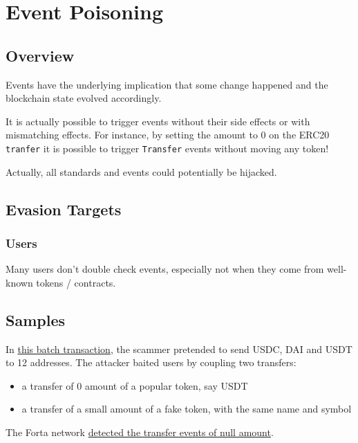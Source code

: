 \section{Event Poisoning} \label{sec:event-poisoning}

\subsection{Overview}

Events have the underlying implication that some change happened and the blockchain state evolved accordingly.

It is actually possible to trigger events without their side effects or with mismatching effects.
For instance, by setting the amount to 0 on the ERC20 \lstinline[language=Solidity]{tranfer} it is possible to trigger \lstinline[language=Solidity]{Transfer} events without moving any token!

Actually, all standards and events could potentially be hijacked.

\subsection{Evasion Targets}

\subsubsection{Users}

Many users don't double check events, especially not when they come from well-known tokens / contracts.

\subsection{Samples}

In \href{https://explorer.phalcon.xyz/tx/polygon/0x8a5f75338bfbf78b0969cdf5bacfe24c65e703ea94b430c470193b3d2a094441?line=1}{this batch transaction}, the scammer pretended to send USDC, DAI and USDT to 12 addresses.
The attacker baited users by coupling two transfers:

\begin{itemize}
\item{a transfer of 0 amount of a popular token, say USDT}
\item{a transfer of a small amount of a fake token, with the same name and symbol}
\end{itemize}

The Forta network \href{https://explorer.forta.network/alerts?limit=20&sort=desc&text=&txHash=0x8a5f75338bfbf78b0969cdf5bacfe24c65e703ea94b430c470193b3d2a094441}{detected the transfer events of null amount}.

